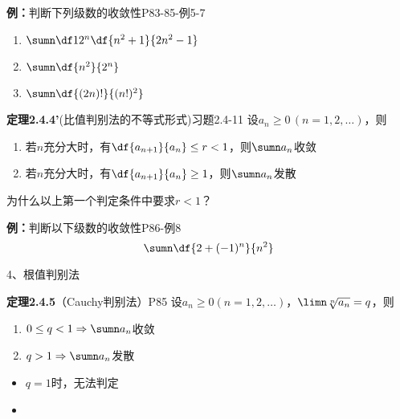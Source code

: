 \begin{frame}
	\linespread{1.5}
	\begin{exampleblock}{{\bf 例：}判断下列级数的收敛性\hfill P83-85-例5-7}
		\begin{enumerate}\pause 
		  \item $\sumn\df 1{2^n}\df{n^2+1}{2n^2-1}$\pause 
		  \item $\sumn\df{n^2}{2^n}$\pause 
		  \item $\sumn\df{(2n)!}{(n!)^2}$
		\end{enumerate}
	\end{exampleblock}
\end{frame}

\begin{frame}%
	\linespread{1}%
	\begin{block}{{\bf 定理2.4.4'}(比值判别法的不等式形式)\hfill 习题2.4-11}
		设$a_n\geq 0\,(n=1,2,\ldots)$，则\pause 
		\begin{enumerate}
		  \item 若$n$充分大时，有$\df{a_{n+1}}{a_n}\leq r<1$，则$\sumn a_n$收敛\pause 
		  \item 若$n$充分大时，有$\df{a_{n+1}}{a_n}\geq 1$，则$\sumn a_n$发散\pause 
		\end{enumerate}
	\end{block}
	为什么以上第一个判定条件中要求$r<1$？
	\pause
	\begin{exampleblock}{{\bf 例：}判断以下级数的收敛性\hfill P86-例8}
		$$\sumn\df{2+(-1)^n}{n^2}$$
	\end{exampleblock}
\end{frame}

\begin{frame}{4、根值判别法}
	\linespread{1.2}\pause 
	\begin{block}{{\bf 定理2.4.5}（Cauchy判别法）\hfill P85}
		设$a_n\geq 0(n=1,2,\ldots)$，$\limn\sqrt[n]{a_n}=q$，则
		\begin{enumerate}
		  \item $0\leq q<1\Rightarrow\sumn a_n$收敛
		  \item $q>1\Rightarrow\sumn a_n$发散
		\end{enumerate}
	\end{block}\pause
	\begin{itemize}
	  \item $q=1$时，无法判定\pause
	  \item {}
	\end{itemize}
\end{frame}

